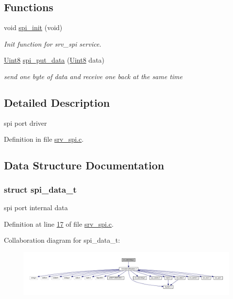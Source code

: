 \subsection*{Functions}
\begin{DoxyCompactItemize}
\item 
void \hyperlink{a00032_ae909944aa85ae98323073c628be541aa}{spi\+\_\+init} (void)
\begin{DoxyCompactList}\small\item\em Init function for srv\+\_\+spi service. \end{DoxyCompactList}\item 
\hyperlink{a00072_af84840501dec18061d18a68c162a8fa2}{Uint8} \hyperlink{a00032_a19e2dff580e4d1b2198fa9108fca81ac}{spi\+\_\+put\+\_\+data} (\hyperlink{a00072_af84840501dec18061d18a68c162a8fa2}{Uint8} data)
\begin{DoxyCompactList}\small\item\em send one byte of data and receive one back at the same time \end{DoxyCompactList}\end{DoxyCompactItemize}


\subsection{Detailed Description}
spi port driver 



Definition in file \hyperlink{a00032_source}{srv\+\_\+spi.\+c}.



\subsection{Data Structure Documentation}
\label{d6/d17/a00778}
\hypertarget{a00032_d6/d17/a00778}{}
\subsubsection{struct spi\+\_\+data\+\_\+t}
spi port internal data 

Definition at line \hyperlink{a00032_source_l00017}{17} of file \hyperlink{a00032_source}{srv\+\_\+spi.\+c}.



Collaboration diagram for spi\+\_\+data\+\_\+t\+:\nopagebreak
\begin{figure}[H]
\begin{center}
\leavevmode
\includegraphics[width=350pt]{dc/dc8/a01695}
\end{center}
\end{figure}


